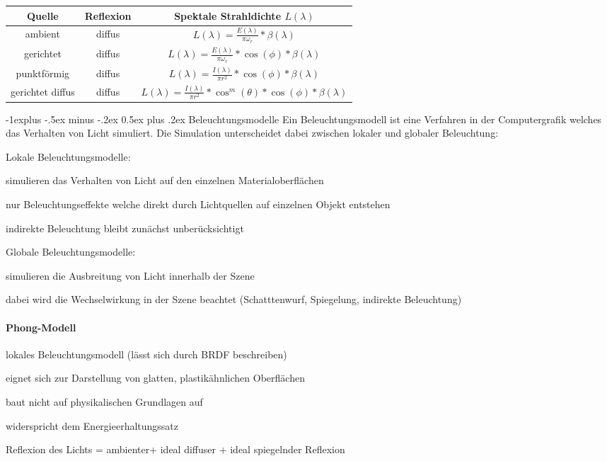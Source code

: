 \documentclass[landscape]{article}
\makeatletter
\renewcommand{\subsection}{\@startsection{subsection}{2}{0mm}%
                                {-1explus -.5ex minus -.2ex}%
                                {0.5ex plus .2ex}%
                                {\normalfont\normalsize\bfseries}}
\makeatother
\begin{document}
\begin{multicols}{3}
  \begin{tabular}{c | c | c}
    Quelle           & Reflexion & Spektale Strahldichte $L(\lambda)$                                                 \\\hline
    ambient          & diffus    & $L(\lambda)=\frac{E(\lambda)}{\pi\omega_r}*\beta(\lambda)$                         \\
    gerichtet        & diffus    & $L(\lambda)=\frac{E(\lambda)}{\pi\omega_r}*\cos(\phi)*\beta(\lambda)$              \\
    punktförmig      & diffus    & $L(\lambda) = \frac{I(\lambda)}{\pi r^2 }*\cos(\phi)*\beta(\lambda)$               \\
    gerichtet diffus & diffus    & $L(\lambda)=\frac{I(\lambda)}{\pi r^2 }* \cos^m(\theta)*\cos(\phi)*\beta(\lambda)$ \\
  \end{tabular}
  
  \subsection{ Beleuchtungsmodelle}
  Ein Beleuchtungsmodell ist eine Verfahren in der Computergrafik welches das Verhalten von Licht simuliert. Die Simulation unterscheidet dabei zwischen lokaler und globaler Beleuchtung:
  \begin{itemize*}
    \item Lokale Beleuchtungsmodelle:
    \item simulieren das Verhalten von Licht auf den einzelnen Materialoberflächen
    \item nur Beleuchtungseffekte welche direkt durch Lichtquellen auf einzelnen Objekt entstehen
    \item indirekte Beleuchtung bleibt zunächst unberücksichtigt
    \item Globale Beleuchtungsmodelle:
    \item simulieren die Ausbreitung von Licht innerhalb der Szene
    \item dabei wird die Wechselwirkung in der Szene beachtet (Schatttenwurf, Spiegelung, indirekte Beleuchtung)
  \end{itemize*}
  
  \paragraph{Phong-Modell}
  \begin{itemize*}
    \item lokales Beleuchtungsmodell (lässt sich durch BRDF beschreiben)
    \item eignet sich zur Darstellung von glatten, plastikähnlichen Oberflächen
    \item baut nicht auf physikalischen Grundlagen auf
    \item widerspricht dem Energieerhaltungssatz
    \item Reflexion des Lichts = ambienter+ ideal diffuser + ideal spiegelnder Reflexion
  \end{itemize*}
  

\end{multicols}
\end{document}
